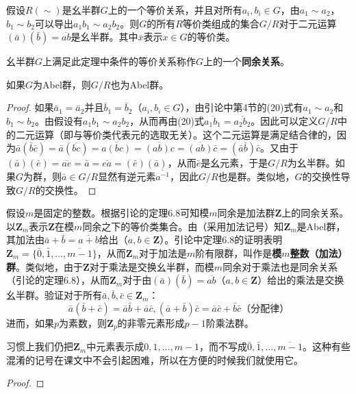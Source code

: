 \documentclass[../../main.tex]{subfiles}
\begin{document}
\begin{theorem}\label{theorem:同余关系}
假设$R(\sim)$是幺半群$G$上的一个等价关系，并且对所有$a_i, b_i \in G$，由$a_1 \sim a_2$，$b_1 \sim b_2$可以导出$a_1 b_1 \sim a_2 b_2$。则$G$的所有$R$等价类组成的集合$G/R$对于二元运算$(\bar{a})(\bar{b}) = \overline{ab}$是幺半群。其中$\bar{x}$表示$x \in G$的等价类。

幺半群$G$上满足此定理中条件的等价关系称作$G$上的一个\textbf{同余关系}。

如果$G$为Abel群，则$G/R$也为Abel群。
\end{theorem}
\begin{proof}
如果$\bar{a}_1 = \bar{a}_2$并且$\bar{b}_1 = \bar{b}_2$（$a_i, b_i \in G$），由引论中第4节的(20)式有$a_1 \sim a_2$和$b_1 \sim b_2$。由假设有$a_1 b_1 \sim a_2 b_2$，从而再由(20)式$\overline{a_1 b_1} = \overline{a_2 b_2}$。因此可以定义$G/R$中的二元运算（即与等价类代表元的选取无关）。这个二元运算是满足结合律的，因为$\bar{a} (\bar{b} \bar{c}) = \bar{a}(\overline{bc}) = \overline{a(bc)} = \overline{(ab)c} = \overline{(ab)} \bar{c} = (\bar{a} \bar{b})\bar{c}$。又由于$(\bar{a})(\bar{e}) = \overline{ae} = \bar{a} = \overline{ea} = (\bar{e})(\bar{a})$，从而$\bar{e}$是幺元素，于是$G/R$为幺半群。如果$G$为群，则$\bar{a} \in G/R$显然有逆元素$\overline{a^{-1}}$，因此$G/R$也是群。类似地，$G$的交换性导致$G/R$的交换性。
\end{proof}

\begin{example}
假设$m$是固定的整数。根据引论的定理6.8可知模$m$同余是加法群$\boldsymbol{Z}$上的同余关系。以$\boldsymbol{Z}_m$表示$\boldsymbol{Z}$在模$m$同余之下的等价类集合。由（采用加法记号）知$\boldsymbol{Z}_m$是Abel群，其加法由$\bar{a} + \bar{b} = \overline{a + b}$给出（$a, b \in \boldsymbol{Z}$）。引论中定理6.8的证明表明$\boldsymbol{Z}_m = \{ \bar{0}, \bar{1}, \dots, \overline{m - 1} \}$，从而$\boldsymbol{Z}_m$对于加法是$m$阶有限群，叫作是\textbf{模$m$整数（加法）群}。类似地，由于$\boldsymbol{Z}$对于乘法是交换幺半群，而模$m$同余对于乘法也是同余关系（引论的定理6.8），从而$\boldsymbol{Z}_m$对于由$(\bar{a})(\bar{b}) = \overline{ab}$（$a, b \in \boldsymbol{Z}$）给出的乘法是交换幺半群。验证对于所有$\bar{a}, \bar{b}, \bar{c} \in \boldsymbol{Z}_m$：
\[\bar{a}(\bar{b} + \bar{c}) = \bar{a}\bar{b} + \bar{a}\bar{c}, (\bar{a} + \bar{b})\bar{c} = \bar{a}\bar{c} + \bar{b}\bar{c} \text{（分配律）}\]
进而，如果$p$为素数，则$\boldsymbol{Z}_p$的非零元素形成$p - 1$阶乘法群。
\end{example}
\begin{remark}
习惯上我们仍把$\boldsymbol{Z}_m$中元素表示成$0, 1, \dots, m - 1$，而不写成$\bar{0}, \bar{1}, \dots, \overline{m - 1}$。这种有些混淆的记号在课文中不会引起困难，所以在方便的时候我们就使用它。
\end{remark}
\begin{proof}

\end{proof}
\end{document}
